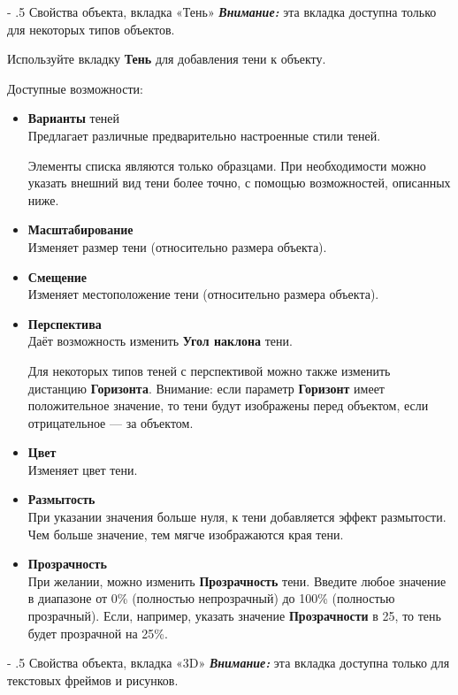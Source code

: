 ﻿\documentclass[a4paper,10pt]{article}
\makeatletter
\renewcommand\paragraph{%
   \@startsection{paragraph}{4}{0mm}%
      {-\baselineskip}%
      {.5\baselineskip}%
      {\normalfont\normalsize\bfseries}}
\makeatother
\begin{document}
\paragraph{Свойства объекта, вкладка «Тень»} \label{sec:свостваобъектавклдкатень}  
\textbf{\textit{Внимание:}} эта вкладка доступна только для некоторых типов объектов.

Используйте вкладку \textbf{Тень} для добавления тени к объекту.

Доступные возможности:

\begin{itemize}
 \item \textbf{Варианты} теней\\
 Предлагает различные предварительно настроенные стили теней.
 
 Элементы списка являются только образцами. При необходимости можно указать внешний вид тени более точно, с помощью возможностей, описанных ниже.
 \item \textbf{Масштабирование}\\
 Изменяет размер тени (относительно размера объекта).
 \item \textbf{Смещение}\\
 Изменяет местоположение тени (относительно размера объекта).
 \item \textbf{Перспектива}\\
 Даёт возможность изменить \textbf{Угол наклона} тени.
 
 Для некоторых типов теней с перспективой можно также изменить дистанцию \textbf{Горизонта}. Внимание: если параметр \textbf{Горизонт} имеет положительное значение, то тени будут изображены перед объектом, если отрицательное — за объектом.
 \item \textbf{Цвет}\\
 Изменяет цвет тени.
 \item \textbf{Размытость}\\
 При указании значения больше нуля, к тени добавляется эффект размытости. Чем больше значение, тем мягче изображаются края тени.
 \item \textbf{Прозрачность}\\
 При желании, можно изменить \textbf{Прозрачность} тени. Введите любое значение в диапазоне от 0\% (полностью непрозрачный) до 100\% (полностью прозрачный). Если, например, указать значение \textbf{Прозрачности} в 25, то тень будет прозрачной на 25\%.
\end{itemize}

\paragraph{Свойства объекта, вкладка «3D»} \label{sec:свойстваобъектвкл3D}
\textbf{\textit{Внимание:}} эта вкладка доступна только для текстовых фреймов и рисунков.
\end{document}
